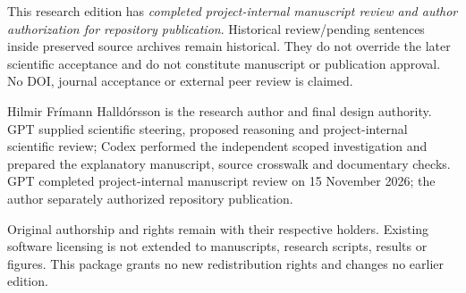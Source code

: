 \documentclass[11pt,a4paper]{article}
\numberwithin{equation}{section}
\theoremstyle{remark}\newtheorem{remark}[theorem]{Remark}
\begin{document}
This research edition has \emph{completed project-internal manuscript review and author authorization for repository publication}. Historical review/pending sentences inside preserved source archives remain historical. They do not override the later scientific acceptance and do not constitute manuscript or publication approval. No DOI, journal acceptance or external peer review is claimed.

Hilmir Fr\'imann Halld\'orsson is the research author and final design authority. GPT supplied scientific steering, proposed reasoning and project-internal scientific review; Codex performed the independent scoped investigation and prepared the explanatory manuscript, source crosswalk and documentary checks. GPT completed project-internal manuscript review on 15 November 2026; the author separately authorized repository publication.

Original authorship and rights remain with their respective holders. Existing software licensing is not extended to manuscripts, research scripts, results or figures. This package grants no new redistribution rights and changes no earlier edition.


\end{document}
